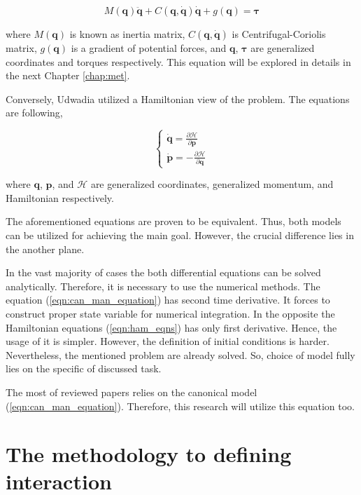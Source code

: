\begin{equation} \label{eqn:can_man_equation}
    M(\mathbf{q})\ddot{\mathbf{q}} + 
    C(\mathbf{q}, \dot{\mathbf{q}}) \dot{\mathbf{q}} + 
    g(\mathbf{q}) = 
    \boldsymbol{\tau}
\end{equation}

where $M(\mathbf{q})$ is known as inertia matrix, $C(\mathbf{q}, \dot{\mathbf{q}})$ 
is Centrifugal-Coriolis matrix, $g(\mathbf{q})$ is a gradient
of potential forces, and $\mathbf{q}$, $\boldsymbol{\tau}$ are generalized 
coordinates and torques respectively. This equation will be explored in details 
in the next Chapter \ref{chap:met}.

Conversely, Udwadia \cite{ConstHamiltonSys} utilized a Hamiltonian view of the 
problem. The equations are following, 

\begin{equation}
    \label{eqn:ham_eqns}
    \begin{cases}
        \dot{\mathbf{q}} = \frac{\partial \mathcal{H}}{\partial \mathbf{p}} \\
        \dot{\mathbf{p}} = -\frac{\partial \mathcal{H}}{\partial \mathbf{q}}
    \end{cases}
\end{equation}

where $\mathbf{q}$, $\mathbf{p}$, and $\mathcal{H}$ are generalized coordinates,
generalized momentum, and Hamiltonian respectively.

The aforementioned equations are proven to be equivalent. Thus, both models 
can be utilized for achieving the main goal. However, the crucial difference 
lies in the another plane. 

In the vast majority of cases the both differential equations can be solved 
analytically. Therefore, it is necessary to use the numerical methods. The 
equation (\ref{eqn:can_man_equation}) has second time derivative. It forces 
to construct proper state variable for numerical integration. In the opposite 
the Hamiltonian equations (\ref{eqn:ham_eqns}) has only first derivative. Hence, 
the usage of it is simpler. However, the definition of initial conditions is harder.
Nevertheless, the mentioned problem are already solved. So, choice of model 
fully lies on the specific of discussed task. 

The most of reviewed papers relies on the canonical model 
(\ref{eqn:can_man_equation}). Therefore, this research will utilize this equation 
too.

\section{The methodology to defining interaction} \label{sec:interaction_def}

